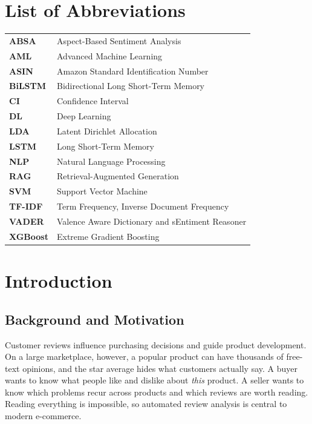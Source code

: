 \documentclass[12pt,a4paper]{report}
\begin{document}
\chapter*{List of Abbreviations}
\begin{tabular}{@{}p{3.2cm}p{11cm}@{}}
\textbf{ABSA} & Aspect-Based Sentiment Analysis \\
\textbf{AML} & Advanced Machine Learning \\
\textbf{ASIN} & Amazon Standard Identification Number \\
\textbf{BiLSTM} & Bidirectional Long Short-Term Memory \\
\textbf{CI} & Confidence Interval \\
\textbf{DL} & Deep Learning \\
\textbf{LDA} & Latent Dirichlet Allocation \\
\textbf{LSTM} & Long Short-Term Memory \\
\textbf{NLP} & Natural Language Processing \\
\textbf{RAG} & Retrieval-Augmented Generation \\
\textbf{SVM} & Support Vector Machine \\
\textbf{TF-IDF} & Term Frequency, Inverse Document Frequency \\
\textbf{VADER} & Valence Aware Dictionary and sEntiment Reasoner \\
\textbf{XGBoost} & Extreme Gradient Boosting \\
\end{tabular}
\clearpage

\chapter{Introduction}
\section{Background and Motivation}
Customer reviews influence purchasing decisions and guide product development. On a large marketplace, however, a popular product can have thousands of free-text opinions, and the star average hides what customers actually say. A buyer wants to know what people like and dislike about \emph{this} product. A seller wants to know which problems recur across products and which reviews are worth reading. Reading everything is impossible, so automated review analysis is central to modern e-commerce.
\end{document}
